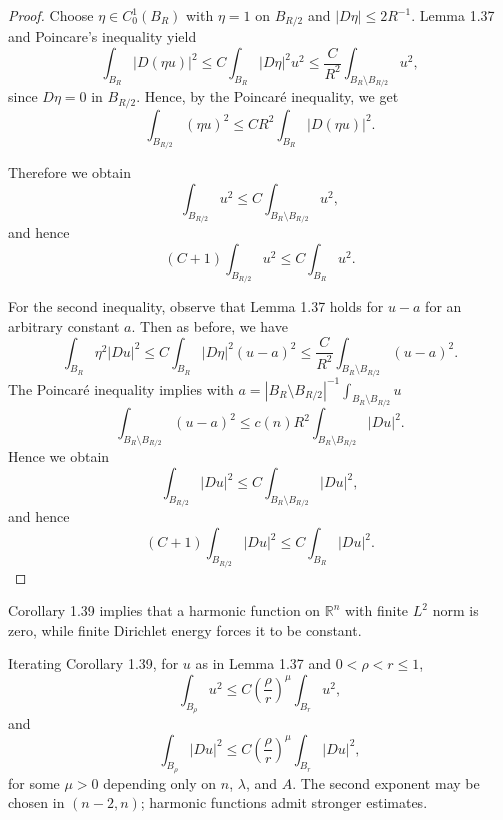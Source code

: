 \begin{proof}
\sketch Choose $\eta\in C_0^1(B_R)$ with $\eta=1$ on $B_{R/2}$ and
$|D\eta|\le2R^{-1}$. Lemma 1.37 and Poincare's inequality yield
\[
\int_{B_R} |D(\eta u)|^2 \le C \int_{B_R} |D\eta|^2 u^2 \le \frac{C}{R^2} \int_{B_R \setminus B_{R/2}} u^2,
\]
since $D\eta = 0$ in $B_{R/2}$. Hence, by the Poincar\'e inequality, we get
\[
\int_{B_{R/2}} (\eta u)^2 \le C R^2 \int_{B_R} |D(\eta u)|^2.
\]

Therefore we obtain
\[
\int_{B_{R/2}} u^2 \le C \int_{B_R \setminus B_{R/2}} u^2,
\]
and hence
\[
(C + 1) \int_{B_{R/2}} u^2 \le C \int_{B_R} u^2.
\]

For the second inequality, observe that Lemma 1.37 holds for $u - a$ for an arbitrary constant $a$. Then as before, we have
\[
\int_{B_R} \eta^2 |Du|^2 \le C \int_{B_R} |D\eta|^2 (u - a)^2 \le \frac{C}{R^2} \int_{B_R \setminus B_{R/2}} (u - a)^2.
\]
The Poincar\'e inequality implies with $a = |B_R \setminus B_{R/2}|^{-1} \int_{B_R \setminus B_{R/2}} u$
\[
\int_{B_R \setminus B_{R/2}} (u - a)^2 \le c(n) R^2 \int_{B_R \setminus B_{R/2}} |Du|^2.
\]
Hence we obtain
\[
\int_{B_{R/2}} |Du|^2 \le C \int_{B_R \setminus B_{R/2}} |Du|^2,
\]
and hence
\[
(C + 1) \int_{B_{R/2}} |Du|^2 \le C \int_{B_R} |Du|^2.
\]

\end{proof}

\begin{remark}\label{hanlin:remark-finite-energy-liouville}
Corollary 1.39 implies that a harmonic function on $\mathbb{R}^n$ with finite
$L^2$ norm is zero, while finite Dirichlet energy forces it to be constant.
\end{remark}

\begin{remark}\label{hanlin:remark-iterated-energy-decay}
Iterating Corollary 1.39, for $u$ as in Lemma 1.37 and $0<\rho<r\le1$,
\[
\int_{B_\rho} u^2 \le C \left(\frac{\rho}{r}\right)^\mu \int_{B_r} u^2,
\]
and
\[
\int_{B_\rho} |Du|^2 \le C \left(\frac{\rho}{r}\right)^\mu \int_{B_r} |Du|^2,
\]
for some $\mu>0$ depending only on $n$, $\lambda$, and $A$. The second exponent
may be chosen in $(n-2,n)$; harmonic functions admit stronger estimates.
\end{remark}

